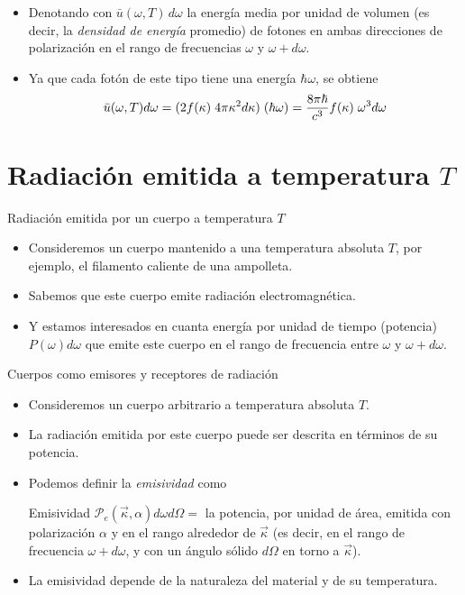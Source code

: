 \documentclass[aspectratio=1610]{beamer}
\newcommand{\kv}{\Vec{\kappa}}
\begin{document}
\begin{frame}
	\begin{itemize}
		\item Denotando con $\bar{u}(\omega,T) \, d\omega$ la energía media por unidad de volumen (es decir, la \emph{densidad de energía} promedio) de fotones en ambas direcciones de polarización en el rango de frecuencias $\omega$ y $\omega+d\omega$.\pause
		\item Ya que cada fotón de este tipo tiene una energía $\hbar\omega$, se obtiene
		\begin{equation}
			\bar{u}(\omega,T)d\omega = (2 f(\kappa)\hspace{1mm}4\pi\kappa^2d\kappa)\hspace{1mm}(\hbar\omega) = \dfrac{8\pi\hbar}{c^3}f(\kappa)\hspace{1mm}\omega^3d\omega
			\label{eq:DensEnerProm}
		\end{equation}
	\end{itemize}
\end{frame}

\section{Radiación emitida a temperatura $T$}
\begin{frame}{Radiación emitida por un cuerpo a temperatura $T$}
	\begin{itemize}
		\item Consideremos un cuerpo mantenido a una temperatura absoluta $T$, por ejemplo, el filamento caliente de una ampolleta.\pause
		\item Sabemos que este cuerpo emite radiación electromagnética.\pause
		\item Y estamos interesados en cuanta energía por unidad de tiempo (potencia) $P(\omega)d\omega$ que emite este cuerpo en el rango de frecuencia  entre $\omega$ y $\omega+d\omega$.
	\end{itemize}
\end{frame}

\begin{frame}{Cuerpos como emisores y receptores de radiación}
	\begin{itemize}
		\item Consideremos un cuerpo arbitrario a temperatura absoluta $T$.\pause
		\item La radiación emitida por este cuerpo puede ser descrita en términos de su potencia.\pause
		\item Podemos definir la \emph{emisividad} como\pause
		\begin{block}{Emisividad}
			$\mathcal{P}_e(\kv,\alpha)d\omega d\Omega = $ la potencia, por unidad de área, emitida con polarización $\alpha$ y en el rango alrededor de $\kv$ (es decir, en el rango de frecuencia $\omega + d\omega$, y con un ángulo sólido $d\Omega$ en torno a $\kv$).
		\end{block}\pause
		\item La emisividad depende de la naturaleza del material y de su temperatura.
	\end{itemize}
\end{frame}
\end{document}
